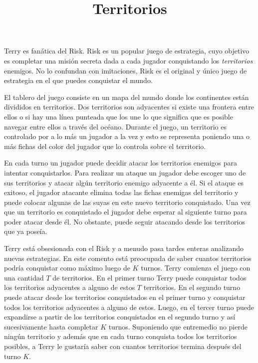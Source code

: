 \documentclass{oci}
\title{Territorios}
\begin{document}
\begin{problemDescription}
  Terry es fanática del Risk.
  Risk es un popular juego de estrategia, cuyo objetivo es completar una misión
  secreta dada a cada jugador conquistando los \emph{territorios} enemigos.
  No lo confundan con imitaciones, Risk es el original y único juego de
  estrategia en el que puedes conquistar el mundo.

  El tablero del juego consiste en un mapa del mundo donde los continentes están
  divididos en territorios.
  Dos territorios son adyacentes si existe una frontera entre ellos o si hay una
  línea punteada que los une lo que significa que es posible navegar entre ellos
  a través del océano.
  Durante el juego, un territorio es controlado por a lo más un jugador a la vez
  y esto se representa poniendo una o más fichas del color del jugador que lo
  controla sobre el territorio. 

  En cada turno un jugador puede decidir atacar los territorios enemigos
  para intentar conquistarlos.
  Para realizar un ataque un jugador debe escoger uno de sus territorios y
  atacar algún territorio enemigo adyacente a él.
  Si el ataque es exitoso, el jugador atacante elimina todas las fichas enemigas
  del territorio y puede colocar algunas de las suyas en este nuevo territorio
  conquistado.
  Una vez que un territorio es conquistado el jugador debe esperar al siguiente
  turno para poder atacar desde él.
  No obstante, puede seguir atacando desde los territorios que ya poseía.

  Terry está obsesionada con el Risk y a menudo pasa tardes enteras analizando
  nuevas estrategias.
  En este comento está preocupada de saber cuantos territorios podría
  conquistar como máximo luego de $K$ turnos.
  Terry comienza el juego con una cantidad $T$ de territorios.
  En el primer turno Terry puede conquistar todos los territorios adyacentes a
  alguno de estos $T$ territorios.
  En el segundo turno puede atacar desde los territorios conquistados en
  el primer turno y conquistar todos los territorios adyacentes a alguno de
  estos.
  Luego, en el tercer turno puede expandirse a partir de los territorios
  conquistados en el segundo turno y así sucesivamente hasta completar $K$
  turnos.
  Suponiendo que entremedio no pierde ningún territorio y además que en cada
  turno conquista todos los territorios posibles, a Terry le gustaría saber con
  cuantos territorios termina después del turno $K$.
\end{problemDescription}
\end{document}

